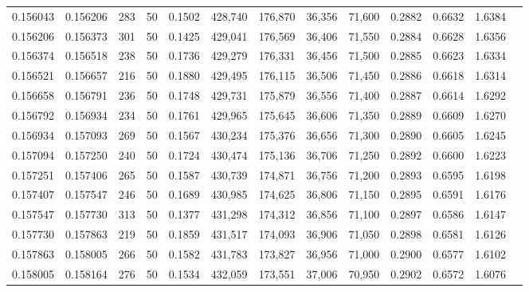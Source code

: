 \begin{tabular}{rrrrrrrrrrrrr}
0.156043 & 0.156206 &   283 &  50 &                                     0.1502 & 428,740 & 176,870 &  36,356 &  71,600 & 0.2882 & 0.6632 & 1.6384 \\
0.156206 & 0.156373 &   301 &  50 &                                     0.1425 & 429,041 & 176,569 &  36,406 &  71,550 & 0.2884 & 0.6628 & 1.6356 \\
0.156374 & 0.156518 &   238 &  50 &                                     0.1736 & 429,279 & 176,331 &  36,456 &  71,500 & 0.2885 & 0.6623 & 1.6334 \\
0.156521 & 0.156657 &   216 &  50 &                                     0.1880 & 429,495 & 176,115 &  36,506 &  71,450 & 0.2886 & 0.6618 & 1.6314 \\
0.156658 & 0.156791 &   236 &  50 &                                     0.1748 & 429,731 & 175,879 &  36,556 &  71,400 & 0.2887 & 0.6614 & 1.6292 \\
0.156792 & 0.156934 &   234 &  50 &                                     0.1761 & 429,965 & 175,645 &  36,606 &  71,350 & 0.2889 & 0.6609 & 1.6270 \\
0.156934 & 0.157093 &   269 &  50 &                                     0.1567 & 430,234 & 175,376 &  36,656 &  71,300 & 0.2890 & 0.6605 & 1.6245 \\
0.157094 & 0.157250 &   240 &  50 &                                     0.1724 & 430,474 & 175,136 &  36,706 &  71,250 & 0.2892 & 0.6600 & 1.6223 \\
0.157251 & 0.157406 &   265 &  50 &                                     0.1587 & 430,739 & 174,871 &  36,756 &  71,200 & 0.2893 & 0.6595 & 1.6198 \\
0.157407 & 0.157547 &   246 &  50 &                                     0.1689 & 430,985 & 174,625 &  36,806 &  71,150 & 0.2895 & 0.6591 & 1.6176 \\
0.157547 & 0.157730 &   313 &  50 &                                     0.1377 & 431,298 & 174,312 &  36,856 &  71,100 & 0.2897 & 0.6586 & 1.6147 \\
0.157730 & 0.157863 &   219 &  50 &                                     0.1859 & 431,517 & 174,093 &  36,906 &  71,050 & 0.2898 & 0.6581 & 1.6126 \\
0.157863 & 0.158005 &   266 &  50 &                                     0.1582 & 431,783 & 173,827 &  36,956 &  71,000 & 0.2900 & 0.6577 & 1.6102 \\
0.158005 & 0.158164 &   276 &  50 &                                     0.1534 & 432,059 & 173,551 &  37,006 &  70,950 & 0.2902 & 0.6572 & 1.6076 \\

\end{tabular}

